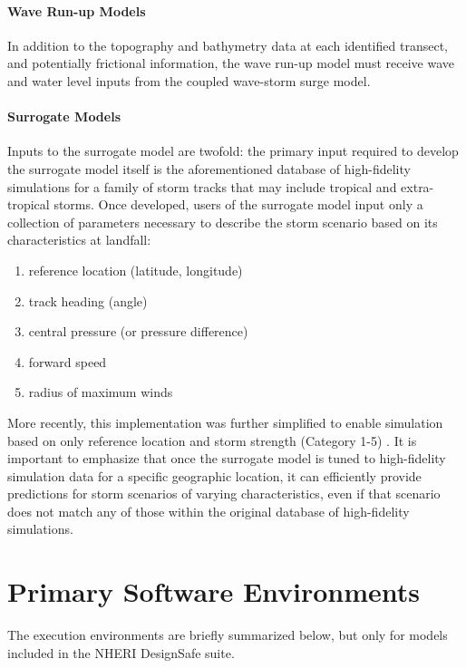 \paragraph{Wave Run-up Models} In addition to the topography and bathymetry data at each identified transect, and potentially frictional information, the wave run-up model must receive wave and water level inputs from the coupled wave-storm surge model.


\paragraph{Surrogate Models} Inputs to the surrogate model are twofold: the primary input required to develop the surrogate model itself is the aforementioned database of high-fidelity simulations for a family of storm tracks that may include tropical and extra-tropical storms. Once developed, users of the surrogate model input only a collection of parameters necessary to describe the storm scenario based on its characteristics at landfall: 

\begin{enumerate}
    \item reference location (latitude, longitude)
    \item track heading (angle)
    \item central pressure (or pressure difference)
    \item forward speed
    \item radius of maximum winds
\end{enumerate}

More recently, this implementation was further simplified to enable simulation based on only reference location and storm strength (Category 1-5) \citep{njcoast2018implementation}. It is important to emphasize that once the surrogate model is tuned to high-fidelity simulation data for a specific geographic location, it can efficiently provide predictions for storm scenarios of varying characteristics, even if that scenario does not match any of those within the original database of high-fidelity simulations. 

\section{Primary Software Environments}
\label{sec:storm_surge_tools}

The execution environments are briefly summarized below, but only for models included in the NHERI DesignSafe suite. 

